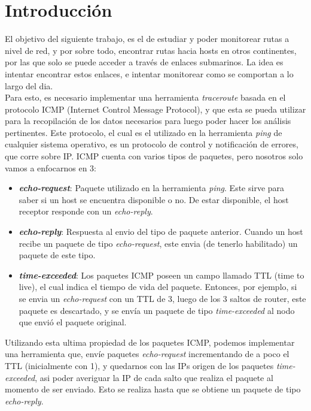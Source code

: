 \section{Introducción}

El objetivo del siguiente trabajo, es el de estudiar y poder monitorear rutas a nivel de red, y por sobre todo, encontrar rutas hacia hosts en otros continentes, por las que solo se puede acceder a través de enlaces submarinos. La idea es intentar encontrar estos enlaces, e intentar monitorear como se comportan a lo largo del dia. \\

Para esto, es necesario implementar una herramienta \textit{traceroute} basada en el protocolo ICMP (Internet Control Message Protocol), y que esta se pueda utilizar para la recopilación de los datos necesarios para luego poder hacer los análisis pertinentes. Este protocolo, el cual es el utilizado en la herramienta \textit{ping} de cualquier sistema operativo, es un protocolo de control y notificación de errores, que corre sobre IP. ICMP cuenta con varios tipos de paquetes, pero nosotros solo vamos a enfocarnos en 3:

\begin{itemize}
	\item \textit{\textbf{echo-request}}: Paquete utilizado en la herramienta \textit{ping}. Este sirve para saber si un host se encuentra disponible o no. De estar disponible, el host receptor responde con un \textit{echo-reply}.
	\item \textit{\textbf{echo-reply}}: Respuesta al envio del tipo de paquete anterior. Cuando un host recibe un paquete de tipo \textit{echo-request}, este envia (de tenerlo habilitado) un paquete de este tipo.
	\item \textit{\textbf{time-exceeded}}: Los paquetes ICMP poseen un campo llamado TTL (time to live), el cual indica el tiempo de vida del paquete. Entonces, por ejemplo, si se envia un \textit{echo-request} con un TTL de 3, luego de los 3 saltos de router, este paquete es descartado, y se envía un paquete de tipo \textit{time-exceeded} al nodo que envió el paquete original.
\end{itemize}

Utilizando esta ultima propiedad de los paquetes ICMP, podemos implementar una herramienta que, envíe paquetes \textit{echo-request} incrementando de a poco el TTL (inicialmente con 1), y quedarnos con las IPs origen de los paquetes \textit{time-exceeded}, asi poder averiguar la IP de cada salto que realiza el paquete al momento de ser enviado. Esto se realiza hasta que se obtiene un paquete de tipo \textit{echo-reply}.\\

